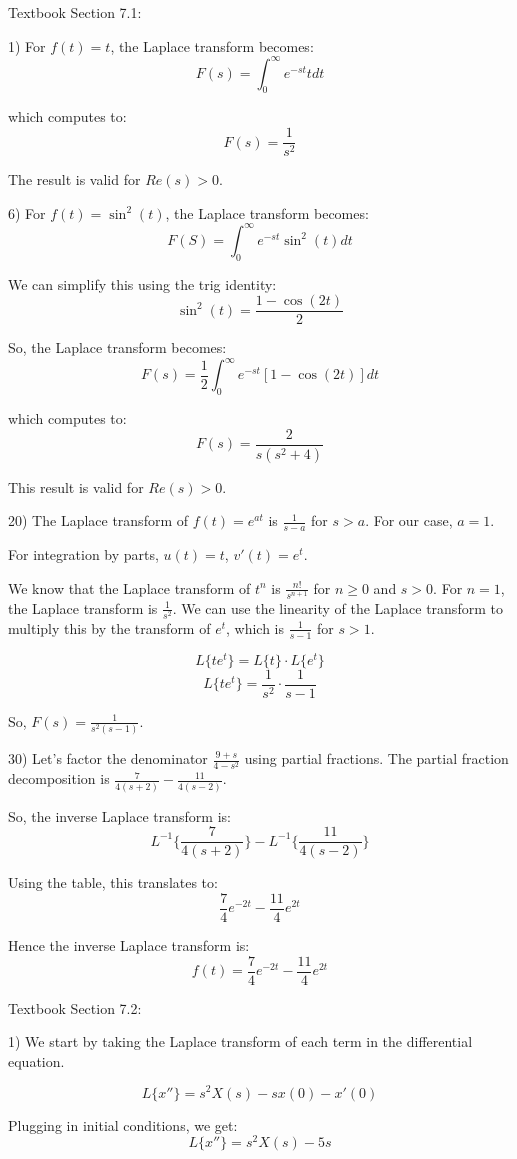\documentclass{article}
\begin{document}
Textbook Section 7.1:

1) For $f(t) = t$, the Laplace transform becomes:
\[F(s) = \int_{0}^{\infty} e^{-st} t dt\]

which computes to:
\[F(s) = \frac{1}{s^2}\]

The result is valid for $Re(s) > 0$.

6) For $f(t) = \sin^2(t)$, the Laplace transform becomes:
\[F(S) = \int_{0}^{\infty} e^{-st} \sin^2(t) dt\]

We can simplify this using the trig identity:
\[\sin^2(t) = \frac{1 - \cos(2t)}{2}\]

So, the Laplace transform becomes:
\[F(s) = \frac{1}{2} \int_{0}^{\infty} e^{-st} [1 - \cos(2t)] dt\]

which computes to:
\[F(s) = \frac{2}{s(s^2 + 4)}\]

This result is valid for $Re(s) > 0$.

20) The Laplace transform of $f(t) = e^{a t}$ is $\frac{1}{s - a}$ for $s > a$.
For our case, $a = 1$.

For integration by parts, $u(t) = t$, $v'(t) = e^t$.

We know that the Laplace transform of $t^n$ is $\frac{n!}{s^{n+1}}$ for $n \geq 0$ and $s > 0$.
For $n = 1$, the Laplace transform is $\frac{1}{s^2}$. We can use the linearity of the Laplace
transform to multiply this by the transform of $e^t$, which is $\frac{1}{s-1}$ for $s > 1$.

\[L\{te^t\} = L\{t\} \cdot L\{e^t\}\]
\[L\{te^t\} = \frac{1}{s^2} \cdot \frac{1}{s-1}\]

So, $F(s) = \frac{1}{s^2(s-1)}$.

30) Let's factor the denominator $\frac{9+s}{4-s^2}$ using partial fractions.
The partial fraction decomposition is $\frac{7}{4(s+2)} - \frac{11}{4(s-2)}$.

So, the inverse Laplace transform is:
\[L^{-1}\{\frac{7}{4(s+2)}\} - L^{-1}\{\frac{11}{4(s-2)}\}\]

Using the table, this translates to:
\[\frac{7}{4} e^{-2t} - \frac{11}{4} e^{2t}\]

Hence the inverse Laplace transform is:
\[f(t) = \frac{7}{4} e^{-2t} - \frac{11}{4} e^{2t}\]


Textbook Section 7.2:

1) We start by taking the Laplace transform of each term in the differential equation.

\[L\{x''\} = s^2 X(s) - sx(0) - x'(0)\]

Plugging in initial conditions, we get:
\[L\{x''\} = s^2 X(s) - 5s\]
\end{document}
